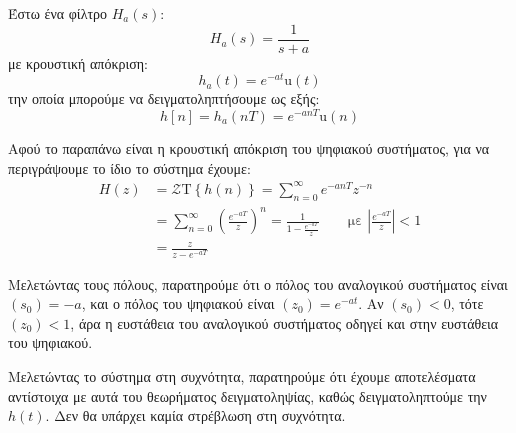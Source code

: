 \documentclass[11pt,a4paper,notitlepage,fleqn]{article}
\begin{document}
Έστω ένα φίλτρο \( H_a(s) \):
\[
H_a(s) =\frac{1}{s+a}
\]
με κρουστική απόκριση:
\[
h_a(t) = e^{-at} \mathrm{u}(t)
\]
την οποία μπορούμε να δειγματοληπτήσουμε ως εξής:
\[
\boxed{h[n] = h_a(nT) = e^{-anT}\mathrm{u}(n)}
\]

Αφού το παραπάνω είναι η κρουστική απόκριση του ψηφιακού συστήματος, για να περιγράψουμε το ίδιο το
σύστημα έχουμε:
\begin{align*}
H(z) &= \mathcal{Z}\mathrm{T}\left\lbrace h(n) \right\rbrace = \sum_{n=0}^{\infty} e^{-anT} z^{-n}
\\&= \sum_{n=0}^{\infty} \left(\frac{e^{-aT}}{z}\right)^n
=\frac{1}{1-\frac{e^{-aT}}{z}} \qquad \text{με } \left|\frac{e^{-aT}}{z}\right|<1
\\ &= \frac{z}{z-e^{-aT}}
\end{align*}

Μελετώντας τους πόλους, παρατηρούμε ότι ο πόλος του αναλογικού συστήματος είναι \( (s_0) = -a \),
και ο πόλος του ψηφιακού είναι \( (z_0) = e^{-at} \). Αν \( (s_0) < 0 \), τότε \( (z_0) < 1 \), άρα
η ευστάθεια του αναλογικού συστήματος οδηγεί και στην ευστάθεια του ψηφιακού.

Μελετώντας το σύστημα στη συχνότητα, παρατηρούμε ότι έχουμε αποτελέσματα αντίστοιχα με αυτά του θεωρήματος δειγματοληψίας, καθώς δειγματοληπτούμε την \( h(t) \). Δεν θα υπάρχει καμία στρέβλωση στη
συχνότητα.
\end{document}
